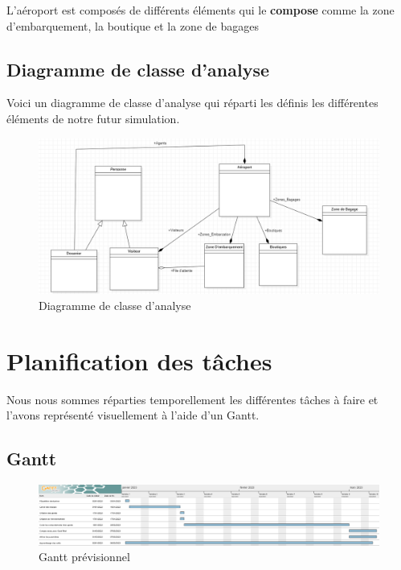 \documentclass[12pt,french]{article} %
\begin{document}
L'aéroport est composés de différents éléments qui le \textbf{compose} comme la zone d'embarquement, la boutique et la zone de bagages


\subsection{Diagramme de classe d'analyse}

Voici un diagramme de classe d'analyse qui réparti les définis les différentes éléments de notre futur simulation.

\begin{figure}[H]
	\centering
	\includegraphics[scale=0.4]{analyse.png}
	\caption{Diagramme de classe d'analyse}    
\end{figure}

\section{Planification des tâches}

Nous nous sommes réparties temporellement les différentes tâches à faire et l'avons représenté visuellement à l'aide d'un Gantt.

\subsection{Gantt}

\begin{figure}[H]
	\centering
	\includegraphics[scale=0.35]{gantt.png}
	\caption{Gantt prévisionnel}    
\end{figure}

\bigskip
\end{document}
